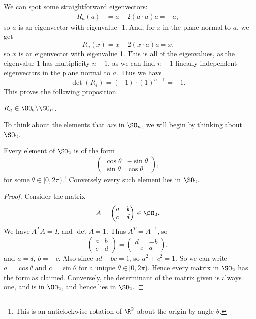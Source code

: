 \documentclass[a4]{scrreprt}
\begin{document}
We can spot some straightforward eigenvectors:
\begin{align*}
R_a(a) &= a - 2(a \cdot a)a = -a,
\end{align*}
so $a$ is an eigenvector with eigenvalue -1. And, for $x$ in the plane normal to $a$, we get
$$
R_a(x) = x - 2(x \cdot a) a = x.
$$
so $x$ is an eigenvector with eigenvalue 1. This is all of the eigenvalues, as the eigenvalue 1 has multiplicity $n - 1$, as we can find $n - 1$ linearly independent eigenvectors in the plane normal to $a$. Thus we have
$$
\det(R_a) = (-1) \cdot (1)^{n - 1} = -1.
$$
This proves the following proposition.
\begin{proposition}
	$R_a \in \OO_n \backslash \SO_n$.
\end{proposition}

To think about the elements that \emph{are} in $\SO_n$, we will begin by thinking about $\SO_2$.

\begin{theorem}[Elements of $\SO_2$]
	Every element of $\SO_2$ is of the form
	$$
	\begin{pmatrix}
		\cos \theta & - \sin \theta \\
		\sin \theta & \cos \theta
	\end{pmatrix},
	$$
	for some $\theta \in [0, 2 \pi)$.\footnote{This is an anticlockwise rotation of $\R^2$ about the origin by angle $\theta$.} Conversely every such element lies in $\SO_2$.
\end{theorem}
\begin{proof}
	Consider the matrix
	$$
A = \begin{pmatrix}
	a & b \\ c & d
\end{pmatrix} \in \SO_2.
	$$
	We have $A^T A = I$, and $\det A = 1$. Thus $A^T = A^{-1}$, so
	$$
	\begin{pmatrix}
		a & b \\ c & d
	\end{pmatrix} = \begin{pmatrix}
		d & -b \\ -c & a
	\end{pmatrix},
	$$
	and $a = d$, $b = -c$. Also since $ad - bc = 1$, so $a^2 + c^2 = 1$. So we can write $a = \cos \theta$ and $c = \sin \theta$ for a unique $\theta \in [0, 2\pi)$. Hence every matrix in $\SO_2$ has the form as claimed. Conversely, the determinant of the matrix given is always one, and is in $\OO_2$, and hence lies in $\SO_2$.
\end{proof}
\end{document}
